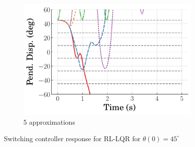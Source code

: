 \begin{figure}
\begin{subfigure}[b]{0.32\textwidth}
    \end{subfigure}
    \hfill
    \begin{subfigure}[b]{0.32\textwidth}
        \centering
        \includegraphics[width=\textwidth]{figures/figures_Interpretability/Mean_ISE_Inverted_Pendulum-v0_cubic_5_bins_near_equil/Curve_fit_time_responses/lumped_LQR/curve_fit_Pend_Disp_45.pdf}
        \caption{5 approximations}
        \label{subfig_chap5:lumped_LQR_near_equil_5_bins_resp_unclipped}
    \end{subfigure}
    \caption{Switching controller response for RL-LQR for $\theta(0)=45^\circ$}
    \label{fig_chap5:lumped_LQR_near_equil_45_resp_unclipped}
\end{figure}
%

